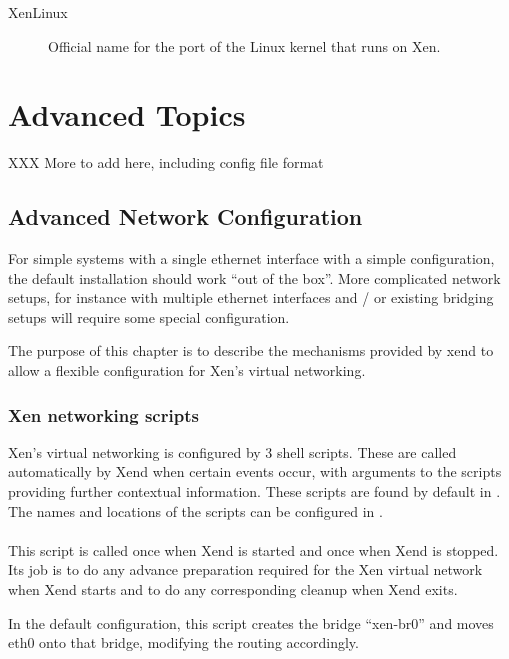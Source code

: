 \documentclass[11pt,twoside,final,openright]{xenstyle}
\begin{document}
{\begin{description}
\item[XenLinux]            Official name for the port of the Linux kernel
                           that runs on Xen.

\end{description}

\part{Advanced Topics}

XXX More to add here, including config file format

\chapter{Advanced Network Configuration}

For simple systems with a single ethernet interface with a simple
configuration, the default installation should work ``out of the
box''.  More complicated network setups, for instance with multiple
ethernet interfaces and / or existing bridging setups will require
some special configuration.

The purpose of this chapter is to describe the mechanisms provided by
xend to allow a flexible configuration for Xen's virtual networking.

\section{Xen networking scripts}

Xen's virtual networking is configured by 3 shell scripts.  These are
called automatically by Xend when certain events occur, with arguments
to the scripts providing further contextual information.  These
scripts are found by default in .  The names and
locations of the scripts can be configured in .

\subsection{}

This script is called once when Xend is started and once when Xend is
stopped.  Its job is to do any advance preparation required for the
Xen virtual network when Xend starts and to do any corresponding
cleanup when Xend exits.

In the default configuration, this script creates the bridge
``xen-br0'' and moves eth0 onto that bridge, modifying the routing
accordingly.

}
\end{document}
